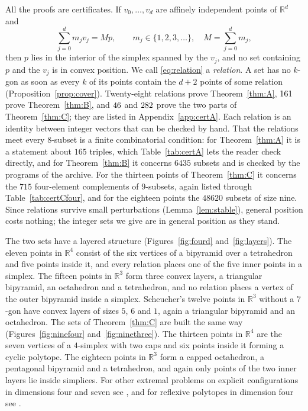 \documentclass[aps,prd,twocolumn,superscriptaddress,nofootinbib,longbibliography,floatfix,showkeys,amsmath,amssymb,10pt]{revtex4-2}
\theoremstyle{plain}
\theoremstyle{definition}
\theoremstyle{plain}
\newcommand{\R}{\mathbb{R}}
\begin{document}
All the proofs are certificates. If $v_0,\dots,v_d$ are affinely independent points of $\R^d$ and
\begin{equation}\label{eq:relation}
\sum_{j=0}^{d} m_j v_j=M p,\qquad m_j\in\{1,2,3,\dots\},\quad M=\sum_{j=0}^d m_j,
\end{equation}
then $p$ lies in the interior of the simplex spanned by the $v_j$, and no set containing $p$ and the $v_j$ is in convex position. We call \eqref{eq:relation} a \emph{relation}. A set has no $k$-gon as soon as every $k$ of its points contain the $d+2$ points of some relation (Proposition~\ref{prop:cover}). Twenty-eight relations prove Theorem~\ref{thm:A}, $161$ prove Theorem~\ref{thm:B}, and $46$ and $282$ prove the two parts of Theorem~\ref{thm:C}; they are listed in Appendix~\ref{app:certA}. Each relation is an identity between integer vectors that can be checked by hand. That the relations meet every $8$-subset is a finite combinatorial condition: for Theorem~\ref{thm:A} it is a statement about $165$ triples, which Table~\ref{tab:certA} lets the reader check directly, and for Theorem~\ref{thm:B} it concerns $6435$ subsets and is checked by the programs of the archive. For the thirteen points of Theorem~\ref{thm:C} it concerns the $715$ four-element complements of $9$-subsets, again listed through Table~\ref{tab:certCfour}, and for the eighteen points the $48620$ subsets of size nine. Since relations survive small perturbations (Lemma~\ref{lem:stable}), general position costs nothing; the integer sets we give are in general position as they stand.

The two sets have a layered structure (Figures~\ref{fig:fourd} and~\ref{fig:layers}). The eleven points in $\R^4$ consist of the six vertices of a bipyramid over a tetrahedron and five points inside it, and every relation places one of the five inner points in a simplex. The fifteen points in $\R^3$ form three convex layers, a triangular bipyramid, an octahedron and a tetrahedron, and no relation places a vertex of the outer bipyramid inside a simplex. Scheucher's twelve points in $\R^3$ without a $7$-gon have convex layers of sizes $5$, $6$ and $1$, again a triangular bipyramid and an octahedron. The sets of Theorem~\ref{thm:C} are built the same way (Figures~\ref{fig:ninefour} and~\ref{fig:ninethree}). The thirteen points in $\R^4$ are the seven vertices of a $4$-simplex with two caps and six points inside it forming a cyclic polytope. The eighteen points in $\R^3$ form a capped octahedron, a pentagonal bipyramid and a tetrahedron, and again only points of the two inner layers lie inside simplices. For other extremal problems on explicit configurations in dimensions four and seven see \cite{BBB26a,BBB26b}, and for reflexive polytopes in dimension four see \cite{Bha26}.
\end{document}
